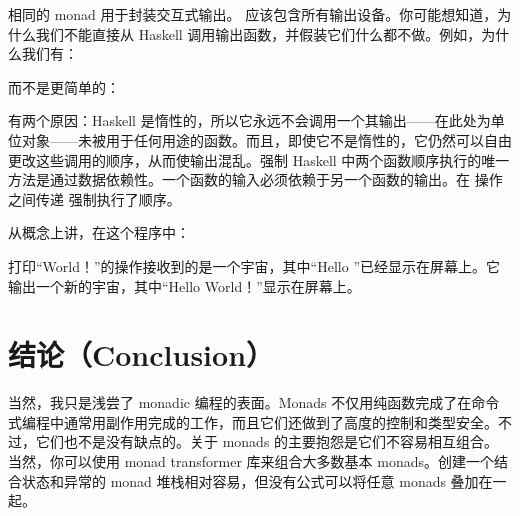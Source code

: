 相同的  monad 用于封装交互式输出。  应该包含所有输出设备。你可能想知道，为什么我们不能直接从 Haskell 调用输出函数，并假装它们什么都不做。例如，为什么我们有：

而不是更简单的：

有两个原因：Haskell 是惰性的，所以它永远不会调用一个其输出——在此处为单位对象——未被用于任何用途的函数。而且，即使它不是惰性的，它仍然可以自由更改这些调用的顺序，从而使输出混乱。强制 Haskell 中两个函数顺序执行的唯一方法是通过数据依赖性。一个函数的输入必须依赖于另一个函数的输出。在  操作之间传递  强制执行了顺序。

从概念上讲，在这个程序中：

打印“World！”的操作接收到的是一个宇宙，其中“Hello ”已经显示在屏幕上。它输出一个新的宇宙，其中“Hello World！”显示在屏幕上。

\section{结论（Conclusion）}

当然，我只是浅尝了 monadic 编程的表面。Monads 不仅用纯函数完成了在命令式编程中通常用副作用完成的工作，而且它们还做到了高度的控制和类型安全。不过，它们也不是没有缺点的。关于 monads 的主要抱怨是它们不容易相互组合。当然，你可以使用 monad transformer 库来组合大多数基本 monads。创建一个结合状态和异常的 monad 堆栈相对容易，但没有公式可以将任意 monads 叠加在一起。
